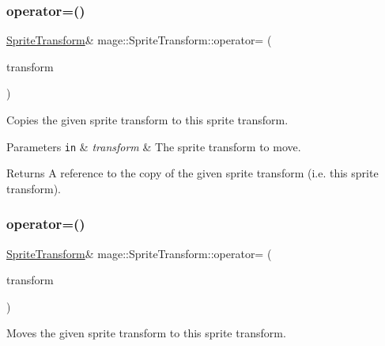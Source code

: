 \subsubsection{\texorpdfstring{operator=()}{operator=()}\hspace{0.1cm}{\footnotesize\ttfamily [1/2]}}
{\footnotesize\ttfamily \hyperlink{structmage_1_1_sprite_transform}{Sprite\+Transform}\& mage\+::\+Sprite\+Transform\+::operator= (\begin{DoxyParamCaption}\item[{const \hyperlink{structmage_1_1_sprite_transform}{Sprite\+Transform} \&}]{transform }\end{DoxyParamCaption})\hspace{0.3cm}{\ttfamily [default]}}

Copies the given sprite transform to this sprite transform.


\begin{DoxyParams}[1]{Parameters}
\mbox{\tt in}  & {\em transform} & The sprite transform to move. \\
\hline
\end{DoxyParams}
\begin{DoxyReturn}{Returns}
A reference to the copy of the given sprite transform (i.\+e. this sprite transform). 
\end{DoxyReturn}
\hypertarget{structmage_1_1_sprite_transform_a9278d3fd0a6d346b188515b67a1adfc2}{}\label{structmage_1_1_sprite_transform_a9278d3fd0a6d346b188515b67a1adfc2} 
\subsubsection{\texorpdfstring{operator=()}{operator=()}\hspace{0.1cm}{\footnotesize\ttfamily [2/2]}}
{\footnotesize\ttfamily \hyperlink{structmage_1_1_sprite_transform}{Sprite\+Transform}\& mage\+::\+Sprite\+Transform\+::operator= (\begin{DoxyParamCaption}\item[{\hyperlink{structmage_1_1_sprite_transform}{Sprite\+Transform} \&\&}]{transform }\end{DoxyParamCaption})\hspace{0.3cm}{\ttfamily [default]}}

Moves the given sprite transform to this sprite transform.


